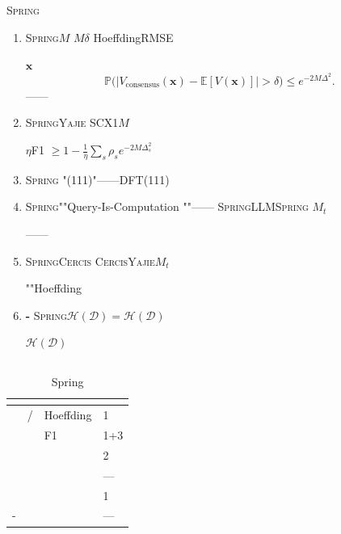 \documentclass[12pt,a4paper]{article}
\theoremstyle{remark}
\newcommand{\E}{\mathbb{E}}
\newcommand{\Pbb}{\mathbb{P}}
\newcommand{\D}{\mathcal{D}}
\newcommand{\Spring}{\textsc{Spring}}
\newcommand{\Yajie}{\textsc{Yajie}}
\newcommand{\Cercis}{\textsc{Cercis}}
\newcommand{\Dhash}{\ensuremath{\mathcal{H}(\D)}}
\DeclareMathOperator{\consensus}{consensus}
\begin{document}
\subsection{}

\Spring{}

\begin{enumerate}[label=\textbf{ \arabic*}, leftmargin=*, itemsep=8pt]

    \item \textbf{}
    \Spring{}$M$
    $M$$\delta$
    HoeffdingRMSE
    
    $\mathbf{x}$
    \begin{equation}
        \Pbb\bigl(|V_{\consensus}(\mathbf{x}) - \E[V(\mathbf{x})]| > \delta\bigr) \leq e^{-2M\Delta^2}.
    \end{equation}
    \textbf{} ——

    \item \textbf{}
    \Spring{}\Yajie{}
    SCX1$M$
    
    \textbf{} $\eta$F1 $\geq 1 - \frac{1}{\eta}\sum_s \rho_s e^{-2M\Delta_s^2}$

    \item \textbf{}
    \Spring{}
    "(111)"——DFT(111)
    
    
    \textbf{} 
    

    \item \textbf{}
    \Spring{}""Query-Is-Computation
    ""——
    \Spring{}LLM\Spring{}
    $M_t$
    
    \textbf{} ——

    \item \textbf{}
    \Spring{}\Cercis{}
    \Cercis{}\Yajie{}$M_t$
    
    
    \textbf{} ""Hoeffding
    

    \item \textbf{-}
    \Spring{}$\Dhash = \mathcal{H}(\D)$
    
    
    \textbf{} $\Dhash$
    

\end{enumerate}

\subsection{}

\begin{table}[H]
\centering
\caption{Spring}
\label{tab:audit_capabilities}
\renewcommand{\arraystretch}{1.6}
\small
\begin{tabular}{p{3.2cm} p{4.5cm} p{4.5cm} p{2.5cm}}
\toprule
\textbf{} & \textbf{} & \textbf{} & \textbf{} \\
\midrule
 & / & Hoeffding & 1 \\
 &  & F1 & 1+3 \\
 &  &  & 2 \\
 &  &  & — \\
 &  &  & 1 \\
- &  &  & — \\
\bottomrule
\end{tabular}
\end{table}
\end{document}
